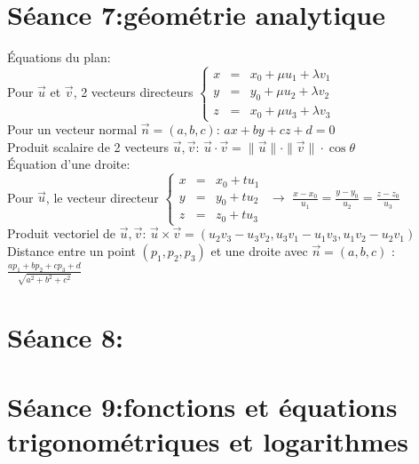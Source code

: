 \documentclass[12pt]{article}
\begin{document}
\section*{S\'eance 7:g\'eom\'etrie analytique}
\'Equations du plan: \\
\indent \indent Pour $\vec{u}$ et $\vec{v}$, 2 vecteurs directeurs
\(\left \lbrace
   \begin{array}{rcl}
      x & = & x_0+\mu u_1+\lambda v_1 \\
      y & = & y_0+ \mu u_2+\lambda v_2 \\
      z & = & x_0+ \mu u_3+\lambda v_3
   \end{array}
\right. \) \\ \newline
\indent \indent Pour un vecteur normal $\vec{n} = (a, b, c)$: $ax+by+cz+d=0$ \\ \newline
\indent Produit scalaire de 2 vecteurs $\vec{u}, \vec{v}$:
$\vec{u}\cdot\vec{v} = \|\vec{u}\| \cdot \|\vec{v}\| \cdot \cos{\theta}$ \\ \newline
\indent \'Equation d'une droite: \\
\indent \indent Pour $\vec{u}$, le vecteur directeur
\(\left \lbrace
	\begin{array}{rcl}
		x & = & x_0+tu_1 \\
		y & = & y_0+tu_2 \\
		z & = & z_0+tu_3
	\end{array} \right. \) $\rightarrow$ $\frac{x-x_0}{u_1} = \frac{y-y_0}{u_2} = \frac{z-z_0}{u_3}$ \\

\indent Produit vectoriel de $\vec{u}, \vec{v}$: $\vec{u} \times \vec{v} = (u_2v_3 - u_3v_2, u_3v_1 - u_1v_3, u_1v_2 - u_2v_1)$ \\

\indent Distance entre un point $(p_1, p_2, p_3)$ et une droite avec $\vec{n} = (a, b, c)$ : $\frac{ap_1+bp_2+cp_3+d}{\sqrt{a^2+b^2+c^2}}$\\
\section*{S\'eance 8:}
\section*{S\'eance 9:fonctions et \'equations trigonom\'etriques et logarithmes}
\end{document}
